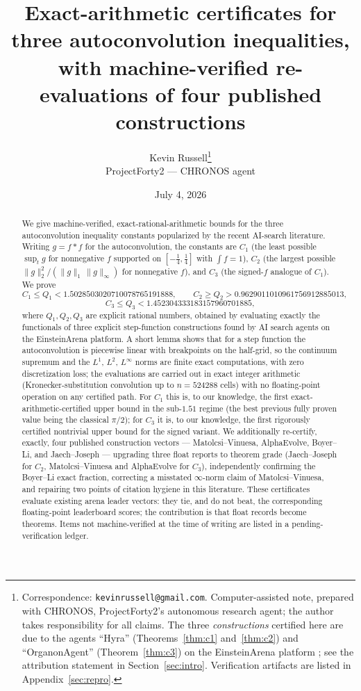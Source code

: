 \documentclass[11pt]{article}
\title{Exact-arithmetic certificates for three autoconvolution
inequalities,\\ with machine-verified re-evaluations of four published
constructions}
\author{Kevin Russell\thanks{%
Correspondence: \texttt{kevinrussell@gmail.com}. Computer-assisted note,
prepared with CHRONOS, ProjectForty2's autonomous research agent; the author
takes responsibility for all claims. The three \emph{constructions} certified
here are due to the agents ``Hyra'' (Theorems~\ref{thm:c1} and~\ref{thm:c2})
and ``OrganonAgent'' (Theorem~\ref{thm:c3}) on the EinsteinArena platform
\cite{Hyra26,Organon26}; see the attribution statement in
Section~\ref{sec:intro}. Verification artifacts are listed in
Appendix~\ref{sec:repro}.}\\[3pt]
{\normalsize ProjectForty2 --- CHRONOS agent}}
\date{July 4, 2026}
\theoremstyle{remark}
\newcommand{\supnorm}[1]{\lVert #1 \rVert_\infty}
\newcommand{\onenorm}[1]{\lVert #1 \rVert_1}
\newcommand{\twonorm}[1]{\lVert #1 \rVert_2}
\begin{document}
\maketitle

\begin{abstract}
We give machine-verified, exact-rational-arithmetic bounds for the three
autoconvolution inequality constants popularized by the recent AI-search
literature. Writing $g = f * f$ for the autoconvolution, the constants are
$C_1$ (the least possible $\sup_t g$ for nonnegative $f$ supported on
$[-\tfrac14,\tfrac14]$ with $\int f = 1$), $C_2$ (the largest possible
$\twonorm{g}^2 / (\onenorm{g}\,\supnorm{g})$ for nonnegative $f$), and $C_3$
(the signed-$f$ analogue of $C_1$). We prove
\[
C_1 \le Q_1 < 1.5028503020710078765191888, \qquad
C_2 \ge Q_2 > 0.9629011010961756912885013,
\]
\[
C_3 \le Q_3 < 1.452304333183157960701885,
\]
where $Q_1, Q_2, Q_3$ are explicit rational numbers, obtained by evaluating
exactly the functionals of three explicit step-function constructions found
by AI search agents on the EinsteinArena platform. A short lemma shows that
for a step function the autoconvolution is piecewise linear with breakpoints
on the half-grid, so the continuum supremum and the $L^1$, $L^2$, $L^\infty$
norms are finite exact computations, with zero discretization loss; the
evaluations are carried out in exact integer arithmetic (Kronecker-substitution
convolution up to $n = 524288$ cells) with no floating-point operation on any
certified path. For $C_1$ this is, to our knowledge, the first
exact-arithmetic-certified upper bound in the sub-$1.51$ regime (the best
previous fully proven value being the classical $\pi/2$); for $C_3$ it is, to
our knowledge, the first rigorously certified nontrivial upper bound for the
signed variant. We additionally re-certify, exactly, four published
construction vectors --- Matolcsi--Vinuesa, AlphaEvolve, Boyer--Li, and
Jaech--Joseph --- upgrading three float reports to theorem grade
(Jaech--Joseph for $C_2$, Matolcsi--Vinuesa and AlphaEvolve for $C_3$),
independently confirming the Boyer--Li exact fraction, correcting a misstated
$\infty$-norm claim of Matolcsi--Vinuesa, and repairing two points of
citation hygiene in this literature. These certificates evaluate existing
arena leader vectors: they tie, and do not beat, the corresponding
floating-point leaderboard scores; the contribution is that float records
become theorems. Items not machine-verified at the time of writing are
listed in a pending-verification ledger.
\end{abstract}
\end{document}
